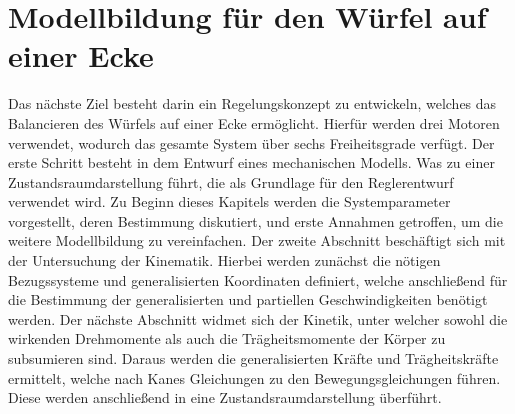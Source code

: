 \ifx\FORMAT\undefined


\fi

\chapter{Modellbildung für den Würfel auf einer Ecke}\label{chapter_TM_Corner}
Das nächste Ziel besteht darin ein Regelungskonzept zu entwickeln, welches das Balancieren des Würfels auf einer Ecke ermöglicht. Hierfür werden drei Motoren verwendet, wodurch das gesamte System über sechs Freiheitsgrade verfügt. Der erste Schritt besteht in dem Entwurf eines mechanischen Modells. Was zu einer Zustandsraumdarstellung führt, die als Grundlage für den Reglerentwurf verwendet wird.
Zu Beginn dieses Kapitels werden die Systemparameter vorgestellt, deren Bestimmung diskutiert, und erste Annahmen getroffen, um die weitere Modellbildung zu vereinfachen. Der zweite Abschnitt beschäftigt sich mit der Untersuchung der Kinematik. Hierbei werden zunächst die nötigen Bezugssysteme und generalisierten Koordinaten definiert, welche anschließend für die Bestimmung der generalisierten und partiellen Geschwindigkeiten benötigt werden.
Der nächste Abschnitt widmet sich der Kinetik, unter welcher sowohl die wirkenden Drehmomente als auch die Trägheitsmomente der Körper zu subsumieren sind. Daraus werden die generalisierten Kräfte und Trägheitskräfte ermittelt, welche nach Kanes Gleichungen zu den Bewegungsgleichungen führen. Diese werden anschließend in eine Zustandsraumdarstellung überführt.
\newpage

\newpage

\newpage


\ifx\FORMAT\undefined

\fi